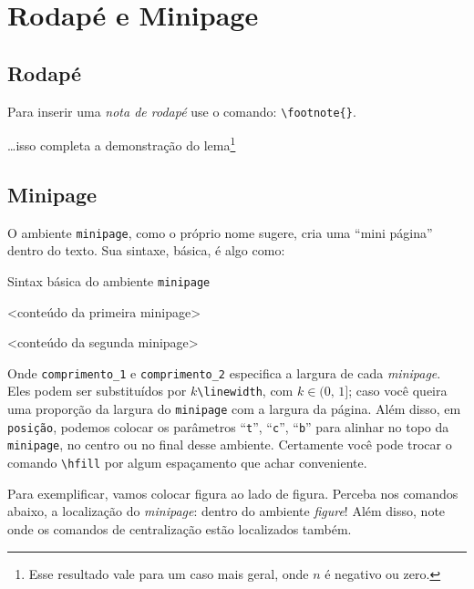 %
  \section{Rodapé e Minipage} %
  \label{sec:pemini}
%
%
  \subsection{Rodapé}
%
Para inserir uma \textit{nota de rodapé} use o comando: \Verb|\footnote{}|.

\begin{tcblisting}{}
\ldots isso completa a demonstração do lema\footnote{Esse resultado vale para 
um caso mais geral, onde $n$ é negativo ou zero.}
\end{tcblisting}

%
  \subsection{Minipage}
%

O ambiente \texttt{minipage}, como o próprio nome sugere, cria uma ``mini página'' 
dentro do texto.
Sua sintaxe, básica, é algo como:

\begin{codigo}{Sintax básica do ambiente \texttt{minipage}}{\lapis}
\begin{minipage}[posição]{comprimento_1}
  <conteúdo da primeira minipage>
\end{minipage}
\hfill
\begin{minipage}[posição]{comprimento_2}
  <conteúdo da segunda minipage>
\end{minipage}
\end{codigo}

Onde \texttt{comprimento\_1} e \texttt{comprimento\_2} especifica a largura de 
cada \textit{minipage}.
Eles podem ser substituídos por \texttt{$k$\textbackslash linewidth}, com 
$k\in(0,\,1]$; caso você queira uma proporção da largura do \texttt{minipage} 
com a largura da página.
Além disso, em \texttt{posição}, podemos colocar os parâmetros ``\texttt{t}'', 
``\texttt{c}'', ``\texttt{b}'' para alinhar no topo da \texttt{minipage}, no 
centro ou no final desse ambiente.
Certamente você pode trocar o comando \Verb|\hfill| por algum espaçamento que 
achar conveniente.

Para exemplificar, vamos colocar figura ao lado de figura.
Perceba nos comandos abaixo, a localização do \textit{minipage}: dentro do 
ambiente \textit{figure}!
Além disso, note onde os comandos de centralização estão localizados também.

